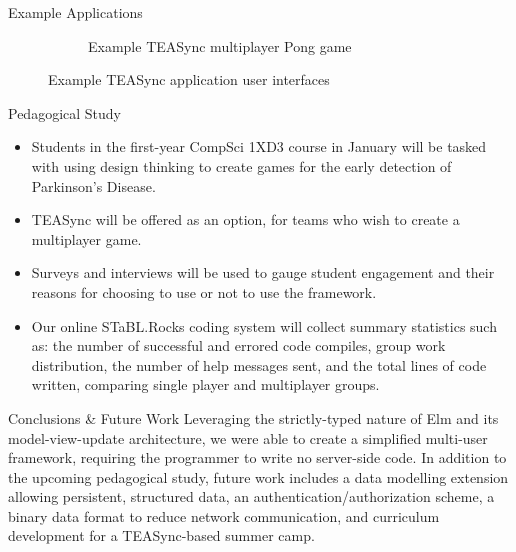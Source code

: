 \documentclass[22pt]{beamer}
\begin{document}
\begin{frame}[fragile]
\begin{textblock}{7.25}
\begin{block}{\fontsize{37}{20}\selectfont Example Applications}
\begin{figure}
\begin{subfigure}{0.49\textwidth}
                    \caption{Example TEASync multiplayer Pong game}
                    \label{Fig:Pong}
                \end{subfigure}
                \caption{Example TEASync application user interfaces}
            \end{figure}
            \vspace{-5mm}
        \end{block}


        \begin{block}{\fontsize{37}{20}\selectfont Pedagogical Study}
            \begin{itemize}
                \item Students in the first-year CompSci 1XD3 course in January will be tasked with using design
                      thinking to create games for the early detection of Parkinson's Disease.
                \item TEASync will be offered as an option, for teams who wish to create a multiplayer game.
                \item Surveys and interviews will be used to gauge student engagement and their reasons for
                      choosing to use or not to use the framework.
                \item Our online STaBL.Rocks coding system will collect summary statistics such as: the number of
                      successful and errored code compiles, group work distribution, the number of help messages
                      sent, and the total lines of code written, comparing single player and multiplayer groups.
            \end{itemize}


        \end{block}

        \begin{block}{\fontsize{37}{20}\selectfont Conclusions \& Future Work}
            Leveraging the strictly-typed nature of Elm and its model-view-update architecture, we were able
            to create a simplified multi-user framework, requiring the programmer to write no server-side code. In addition to the upcoming pedagogical study, future work includes a data modelling extension allowing persistent, structured data, an
            authentication/authorization scheme, a binary data format to reduce network communication, and
            curriculum development for a TEASync-based summer camp.
        \end{block}


\end{textblock}
\end{frame}
\end{document}
